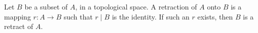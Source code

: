 Let $B$ be a subset of $A$, in a topological space. A retraction of $A$ onto $B$ is a mapping $r: A \rightarrow B$ such that $r \mid B$ is the identity. If such an $r$ exists, then $B$ is a retract of $A$.
